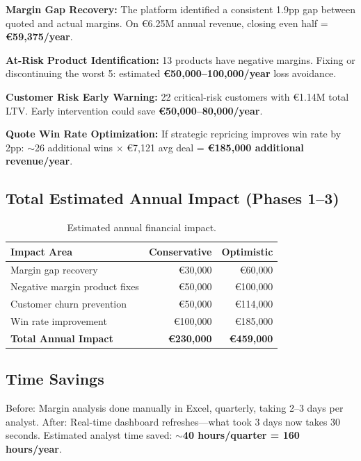 \documentclass[11pt,a4paper]{article}
\newcommand{\EUR}{\euro{}}
\newcommand{\pp}{pp}
\begin{document}
\textbf{Margin Gap Recovery:} The platform identified a consistent 1.9\pp{} gap between quoted and actual margins. On \EUR6.25M annual revenue, closing even half = \textbf{\EUR59{,}375/year}.

\textbf{At-Risk Product Identification:} 13 products have negative margins. Fixing or discontinuing the worst 5: estimated \textbf{\EUR50{,}000--100{,}000/year} loss avoidance.

\textbf{Customer Risk Early Warning:} 22 critical-risk customers with \EUR1.14M total LTV. Early intervention could save \textbf{\EUR50{,}000--80{,}000/year}.

\textbf{Quote Win Rate Optimization:} If strategic repricing improves win rate by 2\pp{}: $\sim$26 additional wins $\times$ \EUR7{,}121 avg deal = \textbf{\EUR185{,}000 additional revenue/year}.

\subsection{Total Estimated Annual Impact (Phases 1--3)}

\begin{table}[H]
\centering
\begin{tabular}{lrr}
\toprule
\textbf{Impact Area} & \textbf{Conservative} & \textbf{Optimistic} \\
\midrule
Margin gap recovery           & \EUR30{,}000  & \EUR60{,}000 \\
Negative margin product fixes & \EUR50{,}000  & \EUR100{,}000 \\
Customer churn prevention     & \EUR50{,}000  & \EUR114{,}000 \\
Win rate improvement          & \EUR100{,}000 & \EUR185{,}000 \\
\midrule
\textbf{Total Annual Impact}  & \textbf{\EUR230{,}000} & \textbf{\EUR459{,}000} \\
\bottomrule
\end{tabular}
\caption{Estimated annual financial impact.}
\end{table}

\subsection{Time Savings}

Before: Margin analysis done manually in Excel, quarterly, taking 2--3 days per analyst. After: Real-time dashboard refreshes---what took 3 days now takes 30 seconds. Estimated analyst time saved: \textbf{$\sim$40 hours/quarter = 160 hours/year}.
\end{document}
